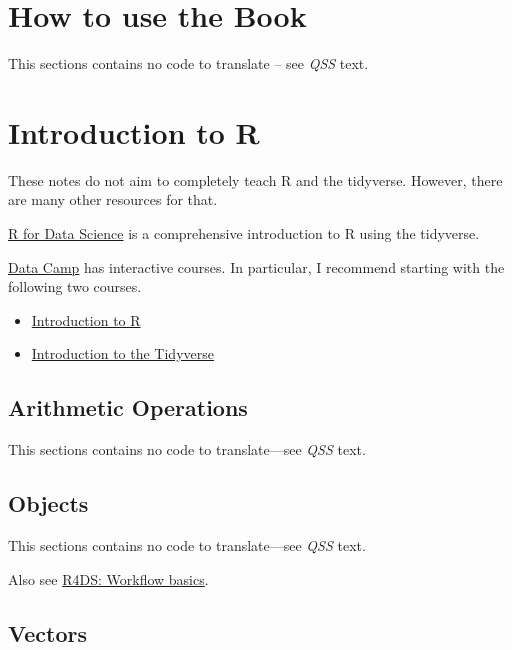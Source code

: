 \documentclass[]{book}
\providecommand{\tightlist}{%
  \setlength{\itemsep}{0pt}\setlength{\parskip}{0pt}}
\theoremstyle{definition}
\theoremstyle{definition}
\theoremstyle{definition}
\theoremstyle{remark}
\begin{document}
\section{How to use the Book}\label{how-to-use-the-book}

This sections contains no code to translate -- see \emph{QSS} text.

\section{Introduction to R}\label{introduction-to-r}

These notes do not aim to completely teach R and the tidyverse. However,
there are many other resources for that.

\href{http://r4ds.had.co.nz/}{R for Data Science} is a comprehensive
introduction to R using the tidyverse.

\href{https://www.datacamp.com/home}{Data Camp} has interactive courses.
In particular, I recommend starting with the following two courses.

\begin{itemize}
\tightlist
\item
  \href{https://www.datacamp.com/courses/free-introduction-to-r}{Introduction
  to R}
\item
  \href{https://www.datacamp.com/courses/introduction-to-the-tidyverse}{Introduction
  to the Tidyverse}
\end{itemize}

\subsection{Arithmetic Operations}\label{arithmetic-operations}

This sections contains no code to translate---see \emph{QSS} text.

\subsection{Objects}\label{objects}

This sections contains no code to translate---see \emph{QSS} text.

Also see \href{http://r4ds.had.co.nz/workflow-basics.html}{R4DS:
Workflow basics}.

\subsection{Vectors}\label{vectors}
\end{document}
